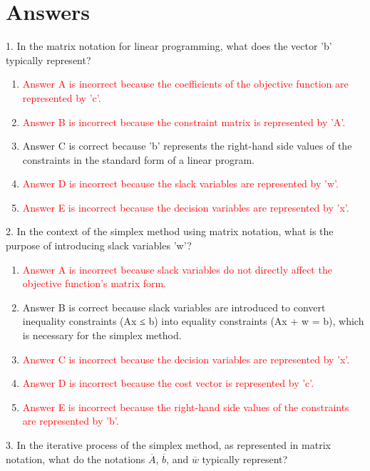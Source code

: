 \documentclass{article}%
\newcommand{\incorrect}[1]{\textcolor{red}{#1}}
\begin{document}
%
\newpage%
\section{Answers}%
\label{sec:Answers}%
1. In the matrix notation for linear programming, what does the vector 'b' typically represent?%
\begin{enumerate}[label=\Alph*.]%
\item \incorrect{Answer A is incorrect because the coefficients of the objective function are represented by 'c'.}%
\item \incorrect{Answer B is incorrect because the constraint matrix is represented by 'A'.}%
\item Answer C is correct because 'b' represents the right-hand side values of the constraints in the standard form of a linear program.%
\item \incorrect{Answer D is incorrect because the slack variables are represented by 'w'.}%
\item \incorrect{Answer E is incorrect because the decision variables are represented by 'x'.}%
\end{enumerate}%
\vspace{1em}%
2. In the context of the simplex method using matrix notation, what is the purpose of introducing slack variables 'w'?%
\begin{enumerate}[label=\Alph*.]%
\item \incorrect{Answer A is incorrect because slack variables do not directly affect the objective function's matrix form.}%
\item Answer B is correct because slack variables are introduced to convert inequality constraints (Ax ≤ b) into equality constraints (Ax + w = b), which is necessary for the simplex method.%
\item \incorrect{Answer C is incorrect because the decision variables are represented by 'x'.}%
\item \incorrect{Answer D is incorrect because the cost vector is represented by 'c'.}%
\item \incorrect{Answer E is incorrect because the right-hand side values of the constraints are represented by 'b'.}%
\end{enumerate}%
\vspace{1em}%
3. In the iterative process of the simplex method, as represented in matrix notation, what do the notations $\overline{A}$, $\overline{b}$, and $\overline{w}$ typically represent?%
\end{document}
